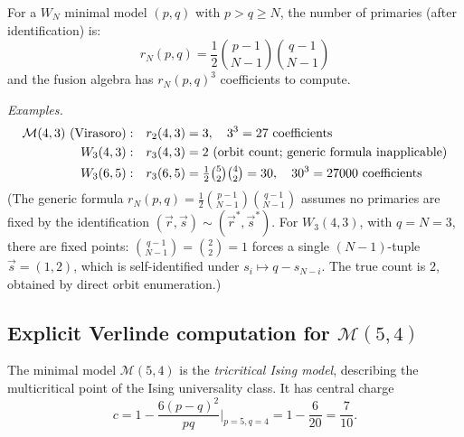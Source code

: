 \begin{remark}\label{rem:wn-complexity}
For a $W_N$ minimal model $(p,q)$ with $p > q \geq N$, the number of primaries (after identification) is:
\[r_N(p,q) = \frac{1}{2}\binom{p-1}{N-1}\binom{q-1}{N-1}\]
and the fusion algebra has $r_N(p,q)^3$ coefficients to compute.

\emph{Examples.}
\begin{align}
\mathcal{M}(4,3) \text{ (Virasoro)}: \quad & r_2(4,3) = 3, \quad 3^3 = 27 \text{ coefficients} \\
W_3(4,3): \quad & r_3(4,3) = 2
\text{ (orbit count; generic formula inapplicable)} \\
W_3(6,5): \quad & r_3(6,5) = \tfrac{1}{2}\tbinom{5}{2}\tbinom{4}{2} = 30,
\quad 30^3 = 27000 \text{ coefficients}
\end{align}
(The generic formula $r_N(p,q) = \frac{1}{2}\binom{p-1}{N-1}\binom{q-1}{N-1}$ assumes no primaries are fixed by the identification $(\vec{r},\vec{s}) \sim (\vec{r}^*, \vec{s}^*)$. For $W_3(4,3)$, with $q = N = 3$, there are fixed points: $\binom{q-1}{N-1} = \binom{2}{2} = 1$ forces a single $(N{-}1)$-tuple $\vec{s} = (1,2)$, which is self-identified under $s_i \mapsto q - s_{N-i}$. The true count is $2$, obtained by direct orbit enumeration.)
\end{remark}


\subsection{\texorpdfstring{Explicit Verlinde computation for $\mathcal{M}(5,4)$}{Explicit Verlinde computation for M(5,4)}}
\label{subsec:verlinde-5-4}

The minimal model $\mathcal{M}(5,4)$ is the \emph{tricritical Ising model}, describing
the multicritical point of the Ising universality class. It has central charge
\begin{equation}\label{eq:c-5-4}
c = 1 - \frac{6(p-q)^2}{pq}\bigg|_{p=5,q=4} = 1 - \frac{6}{20} = \frac{7}{10}.
\end{equation}

